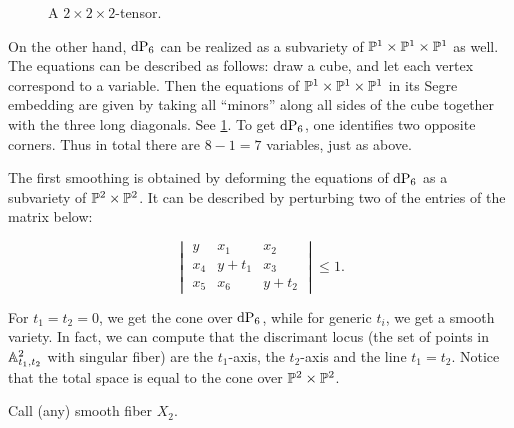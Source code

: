 \begin{figure}[t]
\centering
{}
\caption{A $2 \times 2 \times 2$-tensor.}
\label{fig:p1p1p1_equations}
\end{figure}

On the other hand, $\dP6$ can be realized as a subvariety of $\P^1 \times \P^1 \times \P^1$ as well. The equations can be described as follows: draw a cube, and let each vertex correspond to a variable. Then the equations of $\P^1 \times \P^1 \times \P^1$ in its Segre embedding are given by taking all ``minors'' along all sides of the cube together with the three long diagonals. See \cref{fig:p1p1p1_equations}. To get $\dP6$, one identifies two opposite corners. Thus in total there are $8-1=7$ variables, just as above. 

The first smoothing is obtained by deforming the equations of $\dP6$ as a subvariety of $\P^2 \times \P^2$.  It can be described by perturbing two of the entries of the matrix below:

\begin{equation}
\label{eq:def2}
\begin{vmatrix}
y & x_1 & x_2 \\
x_4 & y+t_1 & x_3 \\
x_5 & x_6 & y+t_2
\end{vmatrix} \leq 1.
\end{equation}


For $t_1=t_2=0$, we get the cone over $\dP6$, while for generic $t_i$, we get a smooth variety. In fact, we can compute that the discrimant locus (the set of points in $\A^2_{t_1,t_2}$ with singular fiber) are the $t_1$-axis, the $t_2$-axis and the line $t_1=t_2$. Notice that the total space is equal to the cone over $\P^2 \times \P^2$.

Call (any) smooth fiber $X_2$. 

